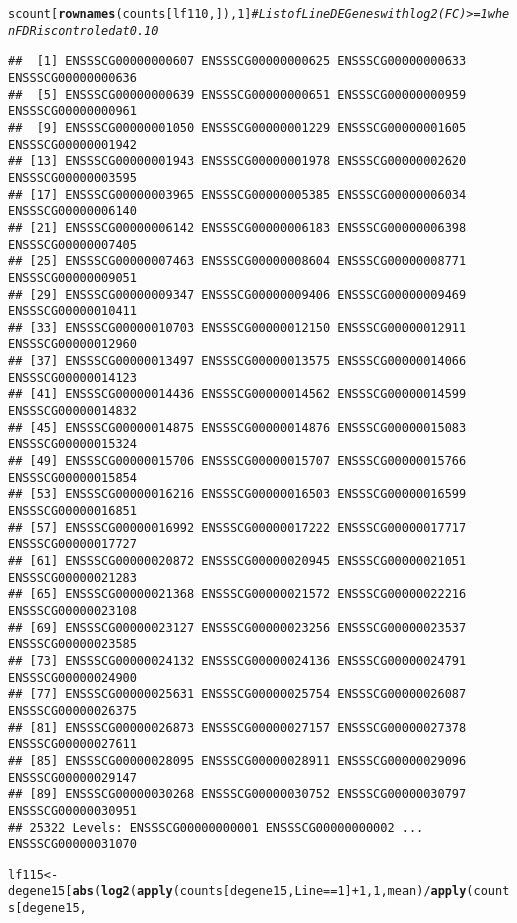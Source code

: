 \documentclass{article}\usepackage[]{graphicx}\usepackage[]{color}
\makeatletter
\newcommand{\hlnum}[1]{\textcolor[rgb]{0.686,0.059,0.569}{#1}}%
\newcommand{\hlcom}[1]{\textcolor[rgb]{0.678,0.584,0.686}{\textit{#1}}}%
\newcommand{\hlopt}[1]{\textcolor[rgb]{0,0,0}{#1}}%
\newcommand{\hlstd}[1]{\textcolor[rgb]{0.345,0.345,0.345}{#1}}%
\newcommand{\hlkwb}[1]{\textcolor[rgb]{0.69,0.353,0.396}{#1}}%
\newcommand{\hlkwd}[1]{\textcolor[rgb]{0.737,0.353,0.396}{\textbf{#1}}}%
\newenvironment{kframe}{%
 \def\at@end@of@kframe{}%
 \ifinner\ifhmode%
  \def\at@end@of@kframe{\end{minipage}}%
  \begin{minipage}{\columnwidth}%
 \fi\fi%
 \def\FrameCommand##1{\hskip\@totalleftmargin \hskip-\fboxsep
 \colorbox{shadecolor}{##1}\hskip-\fboxsep
     \hskip-\linewidth \hskip-\@totalleftmargin \hskip\columnwidth}%
 \MakeFramed {\advance\hsize-\width
   \@totalleftmargin\z@ \linewidth\hsize
   \@setminipage}}%
 {\par\unskip\endMakeFramed%
 \at@end@of@kframe}
\newenvironment{knitrout}{}{} %
\makeatother
\begin{document}
\begin{knitrout}
\begin{kframe}
\begin{alltt}
\hlstd{scount[}\hlkwd{rownames}\hlstd{(counts[lf110, ]),} \hlnum{1}\hlstd{]}  \hlcom{# List of  Line DE Genes with log2(FC) >=1 when FDR is controled at 0.10}
\end{alltt}
\begin{verbatim}
##  [1] ENSSSCG00000000607 ENSSSCG00000000625 ENSSSCG00000000633 ENSSSCG00000000636
##  [5] ENSSSCG00000000639 ENSSSCG00000000651 ENSSSCG00000000959 ENSSSCG00000000961
##  [9] ENSSSCG00000001050 ENSSSCG00000001229 ENSSSCG00000001605 ENSSSCG00000001942
## [13] ENSSSCG00000001943 ENSSSCG00000001978 ENSSSCG00000002620 ENSSSCG00000003595
## [17] ENSSSCG00000003965 ENSSSCG00000005385 ENSSSCG00000006034 ENSSSCG00000006140
## [21] ENSSSCG00000006142 ENSSSCG00000006183 ENSSSCG00000006398 ENSSSCG00000007405
## [25] ENSSSCG00000007463 ENSSSCG00000008604 ENSSSCG00000008771 ENSSSCG00000009051
## [29] ENSSSCG00000009347 ENSSSCG00000009406 ENSSSCG00000009469 ENSSSCG00000010411
## [33] ENSSSCG00000010703 ENSSSCG00000012150 ENSSSCG00000012911 ENSSSCG00000012960
## [37] ENSSSCG00000013497 ENSSSCG00000013575 ENSSSCG00000014066 ENSSSCG00000014123
## [41] ENSSSCG00000014436 ENSSSCG00000014562 ENSSSCG00000014599 ENSSSCG00000014832
## [45] ENSSSCG00000014875 ENSSSCG00000014876 ENSSSCG00000015083 ENSSSCG00000015324
## [49] ENSSSCG00000015706 ENSSSCG00000015707 ENSSSCG00000015766 ENSSSCG00000015854
## [53] ENSSSCG00000016216 ENSSSCG00000016503 ENSSSCG00000016599 ENSSSCG00000016851
## [57] ENSSSCG00000016992 ENSSSCG00000017222 ENSSSCG00000017717 ENSSSCG00000017727
## [61] ENSSSCG00000020872 ENSSSCG00000020945 ENSSSCG00000021051 ENSSSCG00000021283
## [65] ENSSSCG00000021368 ENSSSCG00000021572 ENSSSCG00000022216 ENSSSCG00000023108
## [69] ENSSSCG00000023127 ENSSSCG00000023256 ENSSSCG00000023537 ENSSSCG00000023585
## [73] ENSSSCG00000024132 ENSSSCG00000024136 ENSSSCG00000024791 ENSSSCG00000024900
## [77] ENSSSCG00000025631 ENSSSCG00000025754 ENSSSCG00000026087 ENSSSCG00000026375
## [81] ENSSSCG00000026873 ENSSSCG00000027157 ENSSSCG00000027378 ENSSSCG00000027611
## [85] ENSSSCG00000028095 ENSSSCG00000028911 ENSSSCG00000029096 ENSSSCG00000029147
## [89] ENSSSCG00000030268 ENSSSCG00000030752 ENSSSCG00000030797 ENSSSCG00000030951
## 25322 Levels: ENSSSCG00000000001 ENSSSCG00000000002 ... ENSSSCG00000031070
\end{verbatim}
\begin{alltt}
\hlstd{lf115} \hlkwb{<-} \hlstd{degene15[}\hlkwd{abs}\hlstd{(}\hlkwd{log2}\hlstd{(}\hlkwd{apply}\hlstd{(counts[degene15, Line} \hlopt{==} \hlnum{1}\hlstd{]} \hlopt{+} \hlnum{1}\hlstd{,} \hlnum{1}\hlstd{, mean)}\hlopt{/}\hlkwd{apply}\hlstd{(counts[degene15,}

\end{alltt}
\end{kframe}
\end{knitrout}
\end{document}
